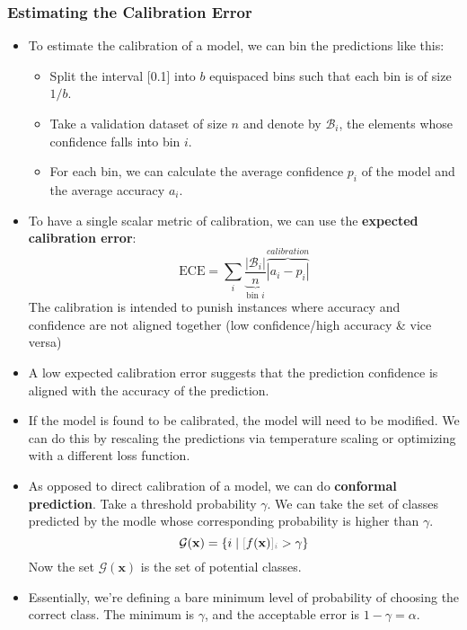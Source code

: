 \documentclass{article}
\newcommand{\tbf}[1]{\textbf{#1}}
\newcommand{\mbf}[1]{\mathbf{#1}}
\begin{document}
    \subsubsection{Estimating the Calibration Error}
    \begin{itemize}
        \item To estimate the calibration of a model, we can bin the predictions like this:
        \begin{itemize}
            \item Split the interval [0.1] into $b$ equispaced bins such that each bin is of size $1/b$. 
            \item Take a validation dataset of size $n$ and denote by $\mathcal{B}_i$, the elements whose confidence falls into bin $i$.
            \item For each bin, we can calculate the average confidence $p_i$ of the model and the average accuracy $a_i$.
        \end{itemize}
        \item To have a single scalar metric of calibration, we can use the \tbf{expected calibration error}:
        \[\text{ECE} = \sum_i \underbrace{\frac{|\mathcal{B}_i|}{n}}_{\text{bin $i$}}\overbrace{|a_i-p_i|}^{calibration}\]
        The calibration is intended to punish instances where accuracy and confidence are not aligned together (low confidence/high accuracy \& vice versa)
        \item A low expected calibration error suggests that the prediction confidence is aligned with the accuracy of the prediction.
        \item If the model is found to be calibrated, the model will need to be modified. We can do this by rescaling the predictions
        via temperature scaling or optimizing with a different loss function.
        \item As opposed to direct calibration of a model, we can do \tbf{conformal prediction}. Take a threshold probability $\gamma$.
        We can take the set of classes predicted by the modle whose corresponding probability is higher than $\gamma$.  
        \[\mathcal{G}(\mathbf{x})=\{i \mid \textcolor{gray}{[}f(\mbf{x})\textcolor{gray}{]_i} > \gamma\}\]
        Now the set $\mathcal{G}(\mbf{x})$ is the set of potential classes.
        \item Essentially, we're defining a bare minimum level of probability of choosing the correct class. The minimum is $\gamma$, 
        and the acceptable error is $1 - \gamma = \alpha$. 
    \end{itemize}
\end{document}
